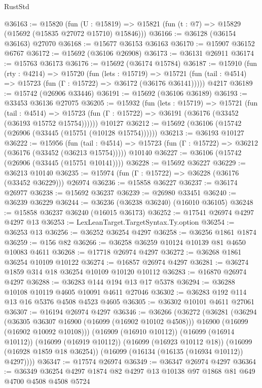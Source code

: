 \begin{lexlean}{RustStd}
\begin{coremodule}
@36163 := @15820
    (fun (U : @15819) => @15821 (fun (t : @7) => @15829 (@15692 (@15835 @27072 @15710) @15846)))
@36166 := @36128 (@36154 @36163) @27070
@36168 := @15677 @36153 @36163
@36170 := @15907 @36152 @6767
@36172 := @15692 (@36106 @26908)
@36173 := @36131 @26911
@36174 := @15763 @36173
@36176 := @15692 (@36174 @15784)
@36187 := @15910
    (fun (rty : @4214) =>
    @15720
      (fun (lets : @15719) =>
      @15721 (fun (tail : @4514) => @15723 (fun (Γ : @15722) => @36172 (@36176 @36141)))))
    @4217
@36189 := @15742 (@26906 @33446)
@36191 := @15692 (@36106 @36189)
@36193 := @33453 @36136 @27075
@36205 := @15932
    (fun (lets : @15719) =>
    @15721
      (fun (tail : @4514) =>
      @15723 (fun (Γ : @15722) => @36191 (@36176 (@33452 (@36193 @15752 @15754))))))
    @10127
@36212 := @15692 (@36106 (@15742 (@26906 (@33445 (@15751 (@10128 @15754))))))
@36213 := @36193 @10127
@36222 := @15956
    (fun (tail : @4514) => @15723 (fun (Γ : @15722) => @36212 (@36176 (@33452 (@36213 @15754)))))
    @10140
@36227 := @36106 (@15742 (@26906 (@33445 (@15751 @10141))))
@36228 := @15692 @36227
@36229 := @36213 @10140
@36235 := @15974 (fun (Γ : @15722) => @36228 (@36176 (@33452 @36229))) @26974
@36236 := @15858 @36227
@36237 := @36174 @26977
@36238 := @15692 @36237
@36239 := @26980 @33451
@36240 := @36239 @36229
@36244 := @36236 (@36238 @36240) (@16010 @36105)
@36248 := @15858 @36237 @36240 (@16015 @36173)
@36252 := @17541 @26974 @4297 @4297 @13
@36253 := LexLeanTarget.TargetSyntax.Ty.option
@36254 := @36253 @13
@36256 := @36252 @36254 @4297
@36258 := @36256 @1861 @1874
@36259 := @156 @82
@36266 := @36258 @36259 @10124 @10139 @81 @4650 @10083 @4611
@36268 := @17718 @26974 @4297
@36272 := @36268 @1861 @36254 @10109 @10122
@36274 := @16857 @26974 @4297
@36281 := @36274 @1859 @314 @18 @36254 @10109 @10120 @10112
@36283 := @16870 @26974 @4297
@36288 := @36283 @144 @194 @13 @17 @5378
@36294 := @36288 @10108 @10119 @4605 @10091 @4611 @27046
@36302 := @36283 @192 @114 @13 @16 @5376 @4508 @4523 @4605
@36305 := @36302 @10101 @4611 @27061
@36307 := @16194 @26974 @4297
@36346 := @36266
    (@36272
      (@36281
        (@36294
          (@36305 @36307 @16900 (@16099 (@16902 @10102 @4508)))
          @16900
          (@16099 (@16902 @10092 @10108)))
        (@16909 (@16910 @10112))
        (@16099 (@16914 @10112))
        (@16099 (@16919 @10112))
        (@16099 (@16923 @10112 @18))
        (@16099 (@16928 @1859 @18 @36254))
        (@16099 (@16134 (@16135 (@16934 @10112)) @4297))))
@36347 := @17574 @26974
@36349 := @36347 @26974 @4297
@36364 := @36349 @36254 @4297 @1874 @82 @4297 @13 @10138 @97 @1868 @81 @649 @4700 @4508 @4508 @5724

\end{coremodule}
\end{lexlean}
